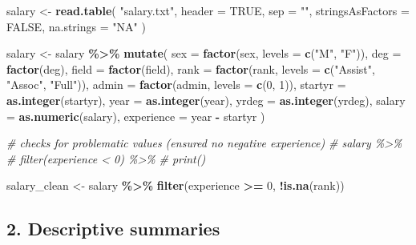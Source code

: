 \documentclass[
]{article}
\newenvironment{Shaded}{\begin{snugshade}}{\end{snugshade}}
\newcommand{\AttributeTok}[1]{\textcolor[rgb]{0.13,0.29,0.53}{#1}}
\newcommand{\CommentTok}[1]{\textcolor[rgb]{0.56,0.35,0.01}{\textit{#1}}}
\newcommand{\ConstantTok}[1]{\textcolor[rgb]{0.56,0.35,0.01}{#1}}
\newcommand{\DecValTok}[1]{\textcolor[rgb]{0.00,0.00,0.81}{#1}}
\newcommand{\FunctionTok}[1]{\textcolor[rgb]{0.13,0.29,0.53}{\textbf{#1}}}
\newcommand{\NormalTok}[1]{#1}
\newcommand{\OtherTok}[1]{\textcolor[rgb]{0.56,0.35,0.01}{#1}}
\newcommand{\SpecialCharTok}[1]{\textcolor[rgb]{0.81,0.36,0.00}{\textbf{#1}}}
\newcommand{\StringTok}[1]{\textcolor[rgb]{0.31,0.60,0.02}{#1}}
\begin{document}
\begin{Shaded}
\begin{Highlighting}[]
\NormalTok{salary }\OtherTok{\textless{}{-}} \FunctionTok{read.table}\NormalTok{(}
  \StringTok{"salary.txt"}\NormalTok{,}
  \AttributeTok{header =} \ConstantTok{TRUE}\NormalTok{,}
  \AttributeTok{sep =} \StringTok{""}\NormalTok{,}
  \AttributeTok{stringsAsFactors =} \ConstantTok{FALSE}\NormalTok{,}
  \AttributeTok{na.strings =} \StringTok{"NA"}
\NormalTok{)}

\NormalTok{salary }\OtherTok{\textless{}{-}}\NormalTok{ salary }\SpecialCharTok{\%\textgreater{}\%}
  \FunctionTok{mutate}\NormalTok{(}
    \AttributeTok{sex =} \FunctionTok{factor}\NormalTok{(sex, }\AttributeTok{levels =} \FunctionTok{c}\NormalTok{(}\StringTok{"M"}\NormalTok{, }\StringTok{"F"}\NormalTok{)),}
    \AttributeTok{deg =} \FunctionTok{factor}\NormalTok{(deg),}
    \AttributeTok{field =} \FunctionTok{factor}\NormalTok{(field),}
    \AttributeTok{rank =} \FunctionTok{factor}\NormalTok{(rank, }\AttributeTok{levels =} \FunctionTok{c}\NormalTok{(}\StringTok{"Assist"}\NormalTok{, }\StringTok{"Assoc"}\NormalTok{, }\StringTok{"Full"}\NormalTok{)),}
    \AttributeTok{admin =} \FunctionTok{factor}\NormalTok{(admin, }\AttributeTok{levels =} \FunctionTok{c}\NormalTok{(}\DecValTok{0}\NormalTok{, }\DecValTok{1}\NormalTok{)),}
    \AttributeTok{startyr =} \FunctionTok{as.integer}\NormalTok{(startyr),}
    \AttributeTok{year =} \FunctionTok{as.integer}\NormalTok{(year),}
    \AttributeTok{yrdeg =} \FunctionTok{as.integer}\NormalTok{(yrdeg),}
    \AttributeTok{salary =} \FunctionTok{as.numeric}\NormalTok{(salary),}
    \AttributeTok{experience =}\NormalTok{ year }\SpecialCharTok{{-}}\NormalTok{ startyr}
\NormalTok{  )}

\CommentTok{\# checks for problematic values (ensured no negative experience)}
\CommentTok{\# salary \%\textgreater{}\%}
  \CommentTok{\# filter(experience \textless{} 0) \%\textgreater{}\%}
  \CommentTok{\# print()}

\NormalTok{salary\_clean }\OtherTok{\textless{}{-}}\NormalTok{ salary }\SpecialCharTok{\%\textgreater{}\%}
  \FunctionTok{filter}\NormalTok{(experience }\SpecialCharTok{\textgreater{}=} \DecValTok{0}\NormalTok{, }\SpecialCharTok{!}\FunctionTok{is.na}\NormalTok{(rank))}
\end{Highlighting}
\end{Shaded}

\subsection{2. Descriptive summaries}\label{descriptive-summaries}
\end{document}
